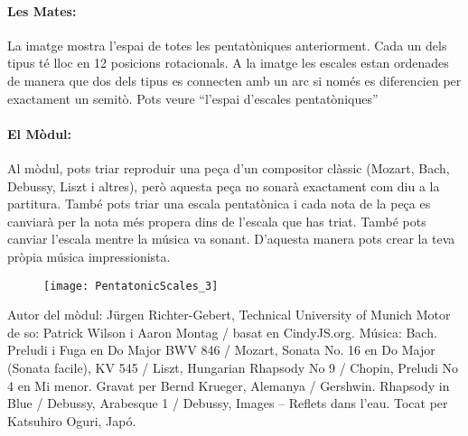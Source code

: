 \paragraph{Les Mates:}  La imatge mostra l'espai de totes les pentatòniques anteriorment. Cada un dels tipus té lloc en 12 posicions rotacionals. A la imatge les escales estan ordenades de manera que dos dels tipus es connecten amb un arc si només es diferencien per exactament un semitò. Pots veure ``l'espai d'escales pentatòniques''

\paragraph{El Mòdul:} Al mòdul, pots triar reproduir una peça d'un compositor clàssic (Mozart, Bach, Debussy, Liszt i altres), però aquesta peça no sonarà exactament com diu a la partitura. També pots triar una escala pentatònica i cada nota de la peça es canviarà per la nota més propera dins de l'escala que has triat. També pots canviar l'escala mentre la música va sonant. D'aquesta manera pots crear la teva pròpia música impressionista.

\begin{figure}
\centering
\texttt{[image: PentatonicScales\_3]}
\end{figure}

\vfill

Autor del mòdul: Jürgen Richter-Gebert, Technical University of Munich
Motor de so: Patrick Wilson i Aaron Montag / basat en CindyJS.org.
Música: Bach. Preludi i Fuga en Do Major BWV 846 / Mozart, Sonata No. 16 en Do Major (Sonata facile), KV 545 / Liszt, Hungarian Rhapsody No 9 / Chopin, Preludi No 4  en Mi menor. Gravat per Bernd Krueger, Alemanya / Gershwin. Rhapsody in Blue / Debussy, Arabesque 1 / Debussy, Images -- Reflets dans l'eau. Tocat per Katsuhiro Oguri, Japó.

